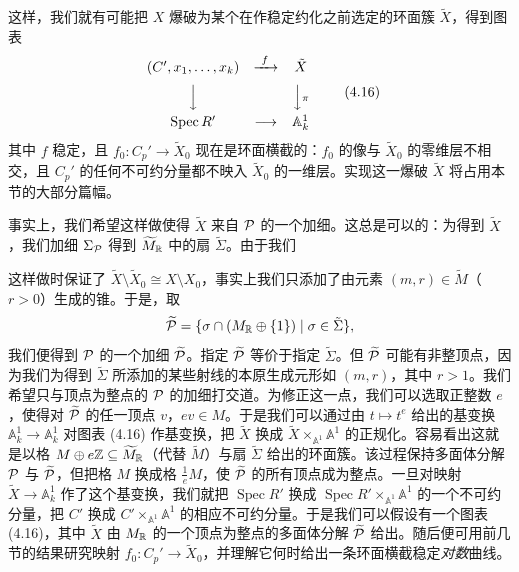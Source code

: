 这样，我们就有可能把 $X$ 爆破为某个在作稳定约化之前选定的环面簇 $\tilde X$，得到图表
\begin{equation}
\begin{array}{ccc}
(C',x_1,\dots,x_k) & \xrightarrow{\ f\ } & \tilde X\\[6pt]
\Big\downarrow & & \Big\downarrow{\scriptstyle\pi}\\[6pt]
\operatorname{Spec} R' & \longrightarrow & \mathbb{A}^1_k
\end{array}
\tag{4.16}
\end{equation}
其中 $f$ 稳定，且 $f_0:C_p'\to\tilde X_0$ 现在是环面横截的：$f_0$ 的像与 $\tilde X_0$ 的零维层不相交，且 $C_p'$ 的任何不可约分量都不映入 $\tilde X_0$ 的一维层。实现这一爆破 $\tilde X$ 将占用本节的大部分篇幅。


事实上，我们希望这样做使得 $\tilde X$ 来自 $\mathcal{P}$ 的一个加细。这总是可以的：为得到 $\tilde X$，我们加细 $\Sigma_{\mathcal{P}}$ 得到 $\widetilde M_{\mathbb{R}}$ 中的扇 $\tilde\Sigma$。由于我们

这样做时保证了 $\tilde X\setminus\tilde X_0\cong X\setminus X_0$，事实上我们只添加了由元素 $(m,r)\in\widetilde M$（$r>0$）生成的锥。于是，取
\[
\widetilde{\mathcal{P}}=\{\sigma\cap(M_{\mathbb{R}}\oplus\{1\})\mid\sigma\in\tilde\Sigma\},
\]
我们便得到 $\mathcal{P}$ 的一个加细 $\widetilde{\mathcal{P}}$。指定 $\widetilde{\mathcal{P}}$ 等价于指定 $\tilde\Sigma$。但 $\widetilde{\mathcal{P}}$ 可能有非整顶点，因为我们为得到 $\tilde\Sigma$ 所添加的某些射线的本原生成元形如 $(m,r)$，其中 $r>1$。我们希望只与顶点为整点的 $\mathcal{P}$ 的加细打交道。为修正这一点，我们可以选取正整数 $e$，使得对 $\widetilde{\mathcal{P}}$ 的任一顶点 $v$，$ev\in M$。于是我们可以通过由 $t\mapsto t^e$ 给出的基变换 $\mathbb{A}^1_k\to\mathbb{A}^1_k$ 对图表 (4.16) 作基变换，把 $\tilde X$ 换成 $\tilde X\times_{\mathbb{A}^1}\mathbb{A}^1$ 的正规化。容易看出这就是以格 $M\oplus e\mathbb{Z}\subseteq\widetilde M_{\mathbb{R}}$（代替 $\widetilde M$）与扇 $\tilde\Sigma$ 给出的环面簇。该过程保持多面体分解 $\mathcal{P}$ 与 $\widetilde{\mathcal{P}}$，但把格 $M$ 换成格 $\frac{1}{e}M$，使 $\widetilde{\mathcal{P}}$ 的所有顶点成为整点。一旦对映射 $\tilde X\to\mathbb{A}^1_k$ 作了这个基变换，我们就把 $\operatorname{Spec} R'$ 换成 $\operatorname{Spec} R'\times_{\mathbb{A}^1}\mathbb{A}^1$ 的一个不可约分量，把 $C'$ 换成 $C'\times_{\mathbb{A}^1}\mathbb{A}^1$ 的相应不可约分量。于是我们可以假设有一个图表 (4.16)，其中 $\tilde X$ 由 $M_{\mathbb{R}}$ 的一个顶点为整点的多面体分解 $\widetilde{\mathcal{P}}$ 给出。随后便可用前几节的结果研究映射 $f_0:C_p'\to\tilde X_0$，并理解它何时给出一条环面横截稳定\emph{对数}曲线。

